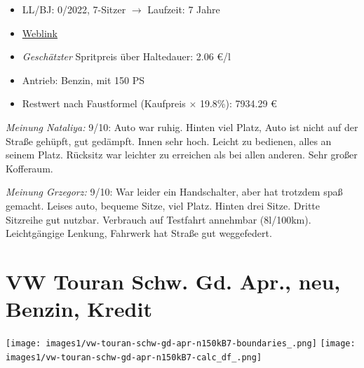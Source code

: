 \documentclass[landscape, DIV=99, 14pt]{scrartcl}
\begin{document}
\begin{itemize}
    \item LL/BJ: 0/2022, 7-Sitzer $\rightarrow$ Laufzeit: 7 Jahre
    \item \href{https://www.volkswagen.de/de/konfigurator.html/__app/touran/touran/comfortline.app?buildabilityStatus-app=buildable&category-app=private&carlineId-app=31000&salesGroupId-app=32600&trimName-app=Comfortline&modelId-app=5T13PZ%24GYORYOR&modelVersion-app=3&modelYear-app=2022&exteriorId-app=F14+5K5K&interiorId-app=F56+++++VE&options-app=MSTD7B2-GPG4PG4-MESSU9C-GPJ9PJ9-GPF6PF6-GPKJPKJ-GPLLPLL-MHKAKH7-GWLLWLL-GWL2WL2-GPM3PM3-GRBDRBD-MTRW3CX-MKSUKA1-MSAB4X4-GP19P19-GWQ1WQ1-GWWCWWC}{Weblink}
    \item \emph{Gesch\"atzter} Spritpreis \"uber Haltedauer: 2.06 \euro{}/l
    \item Antrieb: Benzin, mit 150 PS
    \item Restwert nach Faustformel (Kaufpreis $\times$ 19.8\%): 7934.29 \euro{}
\end{itemize}

\begin{small}
\emph{Meinung Nataliya:} 9/10: Auto war ruhig. Hinten viel Platz, Auto ist nicht auf der Straße gehüpft,
                    gut gedämpft. Innen sehr hoch. Leicht zu bedienen, alles an seinem Platz. Rücksitz
                    war leichter zu erreichen als bei allen anderen. Sehr großer Kofferaum.
        
\emph{Meinung Grzegorz:} 9/10: War leider ein Handschalter, aber hat trotzdem spaß gemacht. 
                   Leises auto, bequeme Sitze, viel Platz. Hinten drei Sitze. Dritte Sitzreihe gut nutzbar.
                   Verbrauch auf Testfahrt annehmbar (8l/100km). Leichtgängige Lenkung, Fahrwerk hat Straße 
                   gut weggefedert.
\end{small}

\pagebreak


\twocolumn

\section*{VW Touran Schw. Gd. Apr., neu, Benzin, Kredit}
\begin{center}
\texttt{[image: images1/vw-touran-schw-gd-apr-n150kB7-boundaries\_.png]}
\null
\vspace{0.5cm}
\texttt{[image: images1/vw-touran-schw-gd-apr-n150kB7-calc\_df\_.png]}
\end{center}
\end{document}
